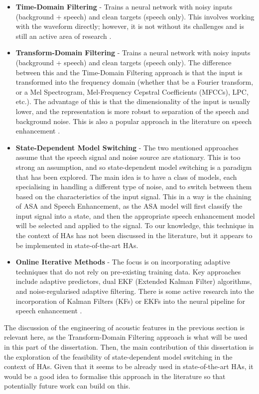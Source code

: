 \documentclass[logo,bsc,singlespacing,parskip,online]{infthesis}
\begin{document}
\begin{itemize}
   \item \textbf{Time-Domain Filtering} - Trains a neural network with noisy inputs (background + speech) and clean targets (speech only). 
   This involves working with the waveform directly; however, it is not without its challenges and is still an active area of research \citep{saleem_time_2024}.
   \item \textbf{Transform-Domain Filtering} - Trains a neural network with noisy inputs (background + speech) and clean targets (speech only). 
   The difference between this and the Time-Domain Filtering approach is that the input is transformed into the frequency domain 
   (whether that be a Fourier transform, or a Mel Spectrogram, Mel-Frequency Cepstral Coefficients (MFCCs), LPC, etc.). The advantage of this 
   is that the dimensionality of the input is usually lower, and the representation is more robust to separation of the speech and background noise.
   This is also a popular approach in the literature on speech enhancement \citep{tan18_interspeech,hou_local_2023}.
   \item \textbf{State-Dependent Model Switching} - The two mentioned approaches assume that the speech signal and noise source are stationary. 
   This is too strong an assumption, and so state-dependent model switching is a paradigm that has been explored. The main idea is 
   to have a class of models, each specialising in handling a different type of noise, and to switch between them based on the characteristics of the input signal. This in a way is the chaining of ASA and Speech Enhancement, as the ASA model will first classify the input signal into a state, and then the appropriate speech enhancement model will be selected and applied to the signal.
   To our knowledge, this technique in the context of HAs has not been discussed in the literature, but it 
   appears to be implemented in state-of-the-art HAs. 
   \item \textbf{Online Iterative Methods} - The focus is on incorporating adaptive techniques that do not rely on pre-existing 
   training data. Key approaches include adaptive predictors, dual EKF (Extended Kalman Filter) algorithms, and noise-regularised adaptive filtering.
   There is some active research into the incorporation of Kalman Filters (KFs) or EKFs into the neural pipeline for speech enhancement \citep{Xue2020NeuralKF, Mellahi2023SpeechEU}.
\end{itemize}
The discussion of the engineering of acoustic features in the previous section is relevant here, as the Transform-Domain Filtering approach
is what will be used in this part of the dissertation. 
Then, the main contribution of this dissertation is the exploration of 
the feasibility of state-dependent model switching in the context of HAs. 
Given that it seems to be already used in state-of-the-art HAs, it 
would be a good idea to formalise this approach in the literature 
so that potentially future work can build on this.
\end{document}
